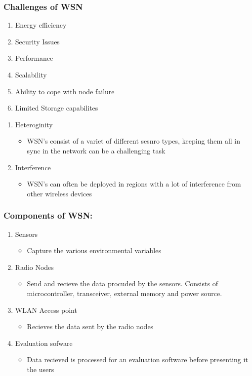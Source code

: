 \documentclass[11pt]{article}
\begin{document}
\subsubsection{Challenges of WSN}
\label{sec:orgb54ced7}
\begin{enumerate}
\item Energy efficiency
\item Security Issues
\item Performance
\item Scalability
\item Ability to cope with node failure
\item Limited Storage capabilites
\end{enumerate}
\begin{enumerate}
\item Heteroginity
\label{sec:org125b184}
\begin{itemize}
\item WSN's consist of a variet of different sesnro types, keeping them all in sync in the network can be a
challenging task
\end{itemize}
\item Interference
\label{sec:org10c5e7b}
\begin{itemize}
\item WSN's can often be deployed in regions with a lot of interference from other wireless devices
\end{itemize}
\end{enumerate}

\subsubsection{Components of WSN:}
\label{sec:org0c2f873}
\begin{enumerate}
\item Sensors
\begin{itemize}
\item Capture the various environmental variables
\end{itemize}
\item Radio Nodes
\begin{itemize}
\item Send and recieve the data procuded by the sensors. Consists of microcontroller, transceiver, external memory
and power source.
\end{itemize}
\item WLAN Access point
\begin{itemize}
\item Recieves the data sent by the radio nodes
\end{itemize}
\item Evaluation sofware
\begin{itemize}
\item Data recieved is processed for an evaluation software before presenting it the users
\end{itemize}
\end{enumerate}
\end{document}
